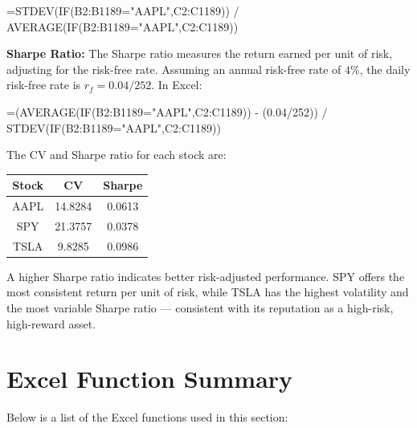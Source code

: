 \documentclass[
  11pt,
  letterpaper,
  DIV=11,
  numbers=noendperiod,
  oneside,
  open=any]{scrreprt}
\newenvironment{Shaded}{\begin{snugshade}}{\end{snugshade}}
\newcommand{\NormalTok}[1]{\textcolor[rgb]{0.00,0.23,0.31}{#1}}
\begin{document}
\begin{Shaded}
\begin{Highlighting}[]
\NormalTok{=STDEV(IF(B2:B1189="AAPL",C2:C1189)) / AVERAGE(IF(B2:B1189="AAPL",C2:C1189))}
\end{Highlighting}
\end{Shaded}

\textbf{Sharpe Ratio:} The Sharpe ratio measures the return earned per
unit of risk, adjusting for the risk-free rate. Assuming an annual
risk-free rate of \(4\%\), the daily risk-free rate is
\(r_f = 0.04/252\). In Excel:

\begin{Shaded}
\begin{Highlighting}[]
\NormalTok{=(AVERAGE(IF(B2:B1189="AAPL",C2:C1189)) {-} (0.04/252)) /}
\NormalTok{  STDEV(IF(B2:B1189="AAPL",C2:C1189))}
\end{Highlighting}
\end{Shaded}

The CV and Sharpe ratio for each stock are:

\begin{table}
\fontsize{12.0pt}{14.0pt}\selectfont
\begin{tabular*}{\linewidth}{@{\extracolsep{\fill}}ccc}
\toprule
{\bfseries Stock} & {\bfseries CV} & {\bfseries Sharpe} \\ 
\midrule\addlinespace[2.5pt]
AAPL & 14.8284 & 0.0613 \\ 
SPY & 21.3757 & 0.0378 \\ 
TSLA & 9.8285 & 0.0986 \\ 
\bottomrule
\end{tabular*}
\end{table}

A higher Sharpe ratio indicates better risk-adjusted performance. SPY
offers the most consistent return per unit of risk, while TSLA has the
highest volatility and the most variable Sharpe ratio --- consistent
with its reputation as a high-risk, high-reward asset.

\section{Excel Function Summary}\label{excel-function-summary-1}

Below is a list of the Excel functions used in this section:
\end{document}
